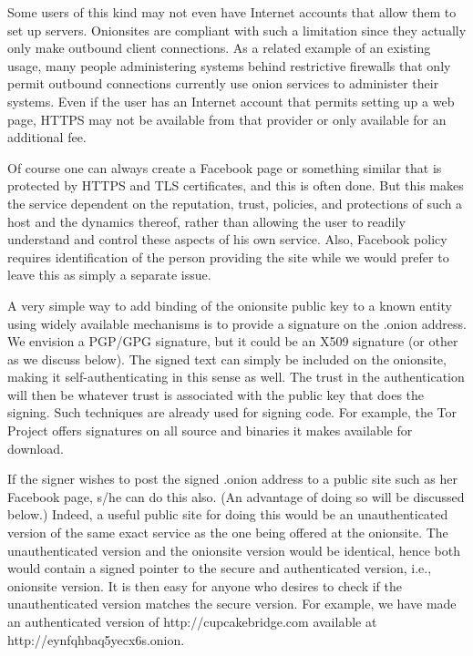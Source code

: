 \documentclass[10pt, conference, compsocconf]{styles/IEEEtran}
\begin{document}
Some users of this kind may
not even have Internet accounts that allow them to set up
servers. Onionsites are compliant with such a limitation since they
actually only make outbound client connections. As a related
example of an existing usage, many people administering systems
behind restrictive firewalls that only permit outbound connections
currently use onion services to administer their systems.  Even if the
user has an Internet account that permits setting up a web page, HTTPS
may not be available from that provider or only available for an
additional fee.

Of course one can always create a Facebook page or something similar
that is protected by HTTPS and TLS certificates,
and this is often done.  But this makes the service dependent on the
reputation, trust, policies, and protections of such a host and the
dynamics thereof, rather than allowing the user to readily understand
and control these aspects of his own service. Also, Facebook
policy requires identification of the person providing the site
while we would prefer to leave this as simply a separate issue.

A very simple way to add binding of the onionsite public key to
a known entity using widely available mechanisms is to provide a
signature on the .onion address. We envision a PGP/GPG signature, but
it could be an X509 signature (or other as we discuss below). 
The signed text can simply be
included on the onionsite, making it self-authenticating in this sense
as well. The trust in the authentication will then be whatever trust
is associated with the public key that does the signing. Such
techniques are already used for signing code. For example,
the Tor Project offers signatures on all source and binaries
it makes available for download. 

If the signer wishes to post the signed .onion address to a public
site such as her Facebook page, s/he can do this also. (An advantage
of doing so will be discussed below.) Indeed, a
useful public site for doing this would be an unauthenticated version
of the same exact service as the one being offered at the onionsite.
The unauthenticated version and the onionsite version would be
identical, hence both would contain a signed pointer to the secure and
authenticated version, i.e., onionsite version. It is then
easy for anyone who desires to check if the unauthenticated version
matches the secure version. For example, we have made an authenticated
version of http://cupcakebridge.com available at http://eynfqhbaq5yecx6s.onion.
\end{document}
